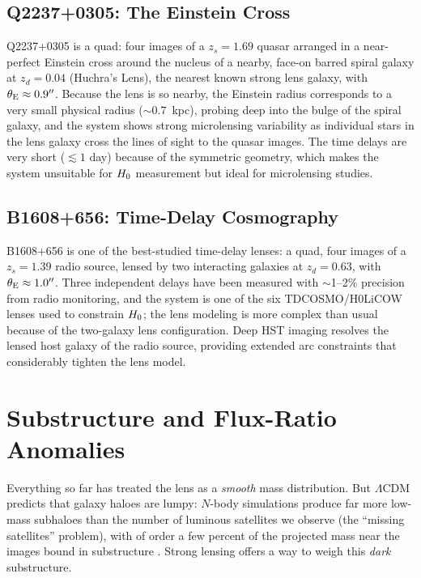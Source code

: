 \subsection{Q2237+0305: The Einstein Cross}

Q2237+0305 is a quad: four images of a $z_s = 1.69$ quasar arranged
in a near-perfect Einstein cross around the nucleus of a nearby,
face-on barred spiral galaxy at $z_d = 0.04$ (Huchra's Lens), the
nearest known strong lens galaxy, with $\theta_{\mathrm{E}} \approx 0.9''$.
Because the lens is so nearby, the Einstein radius corresponds to a
very small physical radius ($\sim 0.7$~kpc), probing deep into the
bulge of the spiral galaxy, and the system shows strong microlensing
variability as individual stars in the lens galaxy cross the lines
of sight to the quasar images.  The time delays are very short
($\lesssim 1$ day) because of the symmetric geometry, which makes
the system unsuitable for $H_0$ measurement but ideal for
microlensing studies.

\subsection{B1608+656: Time-Delay Cosmography}

B1608+656 is one of the best-studied time-delay lenses: a quad, four
images of a $z_s = 1.39$ radio source, lensed by two interacting
galaxies at $z_d = 0.63$, with $\theta_{\mathrm{E}} \approx 1.0''$.  Three
independent delays have been measured with $\sim$1--2\% precision
from radio monitoring, and the system is one of the six
TDCOSMO/H0LiCOW lenses used to constrain $H_0$; the lens
modeling is more complex than usual because of the two-galaxy lens
configuration.  Deep HST imaging resolves the lensed host galaxy of
the radio source, providing extended arc constraints that
considerably tighten the lens model.


\section{Substructure and Flux-Ratio Anomalies}
\label{sec:substructure}

Everything so far has treated the lens as a \emph{smooth} mass
distribution.  But $\Lambda$CDM predicts that galaxy haloes are lumpy:
$N$-body simulations produce far more low-mass subhaloes than the number
of luminous satellites we observe (the ``missing satellites'' problem),
with of order a few percent of the projected mass near the images bound
in substructure \citep[][Part~2, \S8]{schneider_kochanek_wambsganss_2006}.
Strong lensing offers a way to weigh this \emph{dark} substructure.

